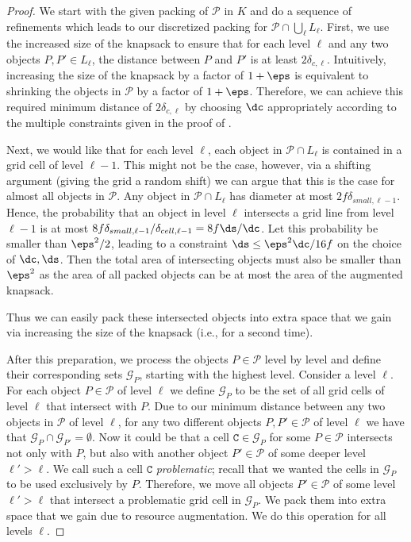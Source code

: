 \documentclass[10pt,a4paper]{article}
\theoremstyle{plain}
\theoremstyle{plain}
\theoremstyle{plain}
\theoremstyle{definition}
\newcommand{\ari}[1]{#1}
\newcommand{\ag}[1]{#1}
\newcommand{\agtwo}[1]{#1}
\begin{document}
\begin{proof}
	We start with the given packing of $\mathcal{P}$ in $K$ and do a
	sequence of refinements which leads to our discretized packing for
	$\mathcal{P}\cap\bigcup_{\ell}L_{\ell}$. First, we use the increased
	size of the knapsack to ensure that for each level $\ell$ and any
	two objects $P,P'\in L_{\ell}$, the distance between $P$ and $P'$
	is at least $2\delta_{c,\ell}$. Intuitively, increasing the size
	of the knapsack by a factor of $1+\eps$ is equivalent to shrinking
	the objects in $\mathcal{P}$ by a factor of $1+\eps$. Therefore,
	we can achieve this required minimum distance of $2\delta_{c,\ell}$
	by choosing $\dc$ \ag{appropriately according to the multiple constraints given in the proof of  }.
	
	
	Next, we would like that for each level $\ell$, each object in $\mathcal{P}\cap L_{\ell}$
	is contained in a grid cell of level $\ell-1$. This might not be
	the case, however, via a shifting argument (giving the grid a random
	shift) we can argue that this is the case for almost all objects in
	$\mathcal{P}$.
 Any object in $\mathcal{P}\cap L_{\ell}$ has diameter at most $2f \delta_{small,\ell-1}$. 
	\ag{Hence, the probability that an object in level $\ell$ intersects a grid line from level $\ell-1$ is at most \ari{$8f\delta_{small,\ell-1}/\delta_{cell,\ell-1}= 8f\ds/\dc$}.
		Let this probability be smaller than $\eps^2/2$, leading to a constraint \ari{$\ds \leq \eps^2\dc/16f$} on the choice of $\dc,\ds$. Then the total area of intersecting objects must also be smaller than $\eps^2$ as the area of all packed objects can be at most the area of \agtwo{the} augmented knapsack.
	}
 
	Thus we can easily pack these intersected objects into extra
	space that we gain via increasing the size of the knapsack (i.e.,
	for a second time).
	
	After this preparation, we process the objects $P\in\mathcal{P}$
	level by level and define their corresponding sets $\mathcal{G}_{P}$,
	starting with the highest level. Consider a level $\ell$. For each
	object $P\in\mathcal{P}$ of level $\ell$ we define $\mathcal{G}_{P}$
	to be the set of all grid cells of level $\ell$ that intersect with
	$P$. Due to our minimum distance between any two objects in $\mathcal{P}$
	of level $\ell$, for any two different objects $P,P'\in\mathcal{P}$
	of level $\ell$ we have that $\mathcal{G}_{P}\cap\mathcal{G}_{P'}=\emptyset$.
	Now it could be that a cell $\texttt{C} \in\mathcal{G}_{P}$ for some $P\in\mathcal{P}$
	intersects not only with $P$, but also with another object $P'\in\mathcal{P}$
	of some deeper level $\ell'>\ell$. We call such a cell $\texttt{C}$ \emph{problematic};
	recall that we wanted the cells in $\mathcal{G}_{P}$ to be used exclusively
	by $P$. Therefore, we move all objects $P'\in\mathcal{P}$ of some
	level $\ell'>\ell$ that intersect a problematic grid \agtwo{cell} in $\mathcal{G}_{P}$.
	We pack them into extra space that we gain due to resource augmentation.
	We do this operation for all levels $\ell$.
	

\end{proof}
\end{document}
